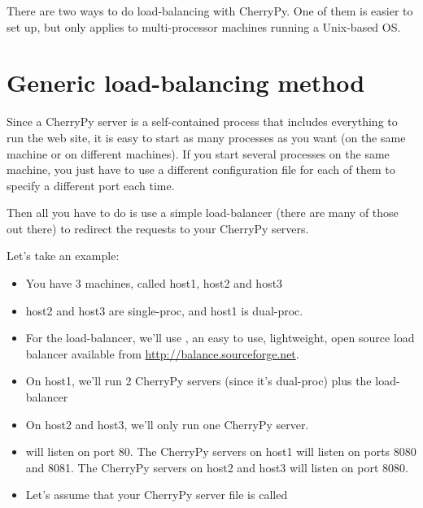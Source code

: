 \documentclass{manual}
\begin{document}
There are two ways to do load-balancing with CherryPy. One of them is easier to set up, but only applies to
multi-processor machines running a Unix-based OS.

\section{Generic load-balancing method}
Since a CherryPy server is a self-contained process that includes everything to run the web site, it is easy to
start as many processes as you want (on the same machine or on different machines). If you start several
processes on the same machine, you just have to use a different configuration file for each of them to specify
a different port each time.

Then all you have to do is use a simple load-balancer (there are many of those out there) to redirect the requests
to your CherryPy servers.


Let's take an example:
\begin{itemize}
\item
You have 3 machines, called host1, host2 and host3
\item
host2 and host3 are single-proc, and host1 is dual-proc.
\item
For the load-balancer, we'll use , an easy to use, lightweight, open source load balancer available from
\url{http://balance.sourceforge.net}.
\item
On host1, we'll run 2 CherryPy servers (since it's dual-proc) plus the load-balancer
\item
On host2 and host3, we'll only run one CherryPy server.
\item
{} will listen on port 80. The CherryPy servers on host1 will listen on ports 8080 and 8081. The CherryPy servers on
host2 and host3 will listen on port 8080.
\item
Let's assume that your CherryPy server file is called 
\end{itemize}
\end{document}
